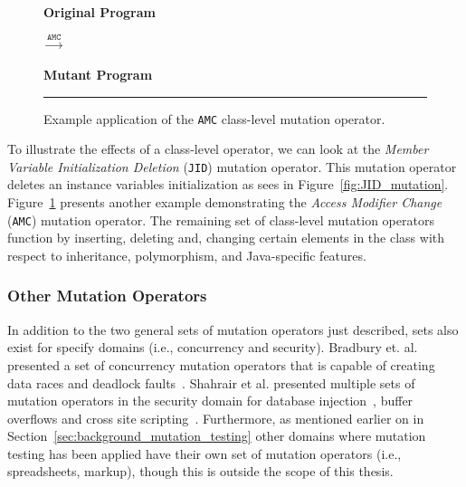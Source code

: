 \begin{figure}[t!]
  \centering
  \begin{minipage}{6.5cm}
  \centering
  \footnotesize{\textbf{Original Program}}
  
  \end{minipage}
  $\xrightarrow{\texttt{AMC}}$
  \begin{minipage}{6.5cm}
  \centering
  \footnotesize{\textbf{Mutant Program}}
  
  \end{minipage}
  \caption{Example application of the \texttt{AMC} class-level mutation operator.}
  \vspace{2mm}
  \hrule
  \label{fig:AMC_mutation}
\end{figure}

To illustrate the effects of a class-level operator, we can look at the \emph{Member Variable Initialization Deletion} (\texttt{JID}) mutation operator. This mutation operator deletes an instance variables initialization as sees in Figure~\ref{fig:JID_mutation}. Figure~\ref{fig:AMC_mutation} presents another example demonstrating the \emph{Access Modifier Change} (\texttt{AMC}) mutation operator. The remaining set of class-level mutation operators function by inserting, deleting and, changing certain elements in the class with respect to inheritance, polymorphism, and Java-specific features.


\subsubsection{Other Mutation Operators}
\label{subsubsec:background_other_operators}
In addition to the two general sets of mutation operators just described, sets also exist for specify domains (i.e., concurrency and security). Bradbury et. al. presented a set of concurrency mutation operators that is capable of creating data races and deadlock faults~\cite{BCD06}. Shahrair et al. presented multiple sets of mutation operators in the security domain for database injection~\cite{SZ08b}, buffer overflows\cite{SZ08} and cross site scripting~\cite{SZ08a}. Furthermore, as mentioned earlier on in Section~\ref{sec:background_mutation_testing} other domains where mutation testing has been applied have their own set of mutation operators (i.e., spreadsheets, markup), though this is outside the scope of this thesis.


